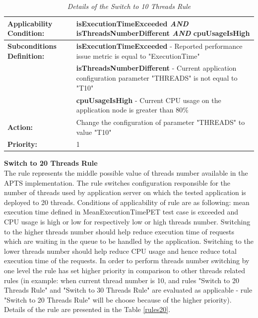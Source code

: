 \documentclass[12pt,a4paper]{article}
\begin{document}
\begin{table}[!htb]
\def\arraystretch{1.5}
\caption{\textit{Details of the Switch to 10 Threads Rule}} \label{rules10}
\begin{tabularx}{\textwidth}{p{2.1cm}|X}

\textbf{Applicability Condition:} & \textbf{isExecutionTimeExceeded} \textit{AND} \newline
\textbf{isThreadsNumberDifferent} \textit{AND} \newline
\textbf{cpuUsageIsHigh} \\ \hline

\textbf{Subconditions Definition:} & \textbf{isExecutionTimeExceeded} -  Reported performance issue metric is equal to "ExecutionTime"  \\
& \textbf{isThreadsNumberDifferent} -  Current application configuration parameter "THREADS" is not equal to "T10" \\
& \textbf{cpuUsageIsHigh} - Current CPU usage on the application node is greater than 80\% \\ \hline

\textbf{Action:} & Change the configuration of parameter "THREADS" to value "T10" \\ \hline
\textbf{Priority:} & 1\\
\end{tabularx}
\end{table}
\vspace{5mm}
\noindent\textbf{Switch to 20 Threads Rule} \\
The rule represents the middle possible value of threads number available in the APTS implementation. The rule switches configuration responsible for the number of threads used by application server on which the tested application is deployed to 20 threads. Conditions of applicability of rule are as following: mean execution time defined in MeanExecutionTimePET test case is exceeded and CPU usage is high or low for respectively low or high threads number. Switching to the higher threads number should help reduce execution time of requests which are waiting in the queue to be handled by the application. Switching to the lower threads number should help reduce CPU usage and hence reduce total execution time of the requests. In order to perform threads number switching by one level the rule has set higher priority in comparison to other threads related rules (in example: when current thread number is 10, and rules "Switch to 20 Threads Rule" and "Switch to 30 Threads Rule" are evaluated as applicable - rule "Switch to 20 Threads Rule" will be choose because of the higher priority). Details of the rule are presented in the Table \ref{rules20}.
\end{document}
